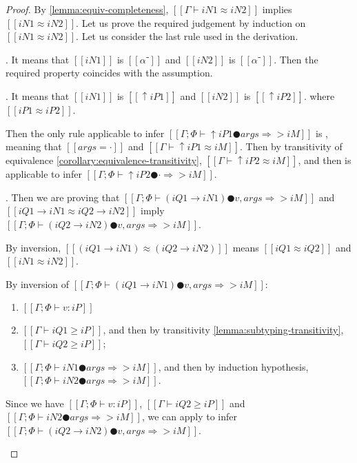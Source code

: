 \lemmaAppInfEquStable*
\begin{proof}
    By \cref{lemma:equiv-completeness}, 
    $[[Γ ⊢ iN1 ≈ iN2]]$ implies $[[iN1 ≈ iN2]]$.
    Let us prove the required judgement by induction on $[[iN1 ≈ iN2]]$.
    Let us consider the last rule used in the derivation.
    \begin{caseof}
        \item {}.
            It means that $[[iN1]]$ is $[[α⁻]]$ and $[[iN2]]$ is $[[α⁻]]$.
            Then the required property coincides with the assumption. 
        \item {}. 
            It means that $[[iN1]]$ is $[[↑iP1]]$ and $[[iN2]]$ is $[[↑iP2]]$.
            where $[[iP1 ≈ iP2]]$.

            Then the only rule applicable to infer $[[Γ; Φ ⊢ ↑iP1 ● args ⇒> iM]]$
            is ,
            meaning that $[[args = ·]]$ and $[[Γ ⊢ ↑iP1 ≈ iM]]$.
            Then by transitivity of equivalence \cref{corollary:equivalence-transitivity},
            $[[Γ ⊢ ↑iP2 ≈ iM]]$, and then  is applicable to infer
            $[[Γ; Φ ⊢ ↑iP2 ● · ⇒> iM]]$.
        
        \item {}.
            Then we are proving that  
            $[[Γ; Φ ⊢ (iQ1 → iN1) ● v, args ⇒> iM]]$ and $[[iQ1 → iN1 ≈ iQ2 → iN2]]$
            imply $[[Γ; Φ ⊢ (iQ2 → iN2) ● v, args ⇒> iM]]$.
            
            By inversion, $[[(iQ1 → iN1) ≈ (iQ2 → iN2)]]$
            means $[[iQ1 ≈ iQ2]]$ and $[[iN1 ≈ iN2]]$.

            By inversion of $[[Γ; Φ ⊢ (iQ1 → iN1) ● v, args ⇒> iM]]$:
            \begin{enumerate}
                \item $[[Γ ; Φ ⊢ v : iP]]$
                \item $[[Γ ⊢ iQ1 ≥ iP]]$,
                    and then by transitivity \cref{lemma:subtyping-transitivity},
                    $[[Γ ⊢ iQ2 ≥ iP]]$;
                \item $[[Γ ; Φ ⊢ iN1 ● args ⇒> iM]]$, 
                    and then by induction hypothesis, $[[Γ ; Φ ⊢ iN2 ● args ⇒> iM]]$.
            \end{enumerate}

            Since we have $[[Γ ; Φ ⊢ v : iP]]$, $[[Γ ⊢ iQ2 ≥ iP]]$ and 
            $[[Γ ; Φ ⊢ iN2 ● args ⇒> iM]]$, we can apply 
            to infer $[[Γ; Φ ⊢ (iQ2 → iN2) ● v, args ⇒> iM]]$.


\end{caseof}
\end{proof}
